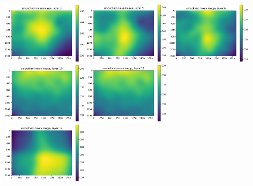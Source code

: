 \documentclass[letterpaper,11pt]{article}
\begin{document}
\begin{figure}[!ht]
\centering
\includegraphics[width=0.32\textwidth]{images/results/smoothed_mean_image_layers_polaris/smoothed_mean_image_layer_1}
\includegraphics[width=0.32\textwidth]{images/results/smoothed_mean_image_layers_polaris/smoothed_mean_image_layer_5}
\includegraphics[width=0.32\textwidth]{images/results/smoothed_mean_image_layers_polaris/smoothed_mean_image_layer_9}
\includegraphics[width=0.32\textwidth]{images/results/smoothed_mean_image_layers_polaris/smoothed_mean_image_layer_10}
\includegraphics[width=0.32\textwidth]{images/results/smoothed_mean_image_layers_polaris/smoothed_mean_image_layer_11} \\
\includegraphics[width=0.32\textwidth]{images/results/smoothed_mean_image_layers_polaris/smoothed_mean_image_layer_12}

\end{figure}
\end{document}
